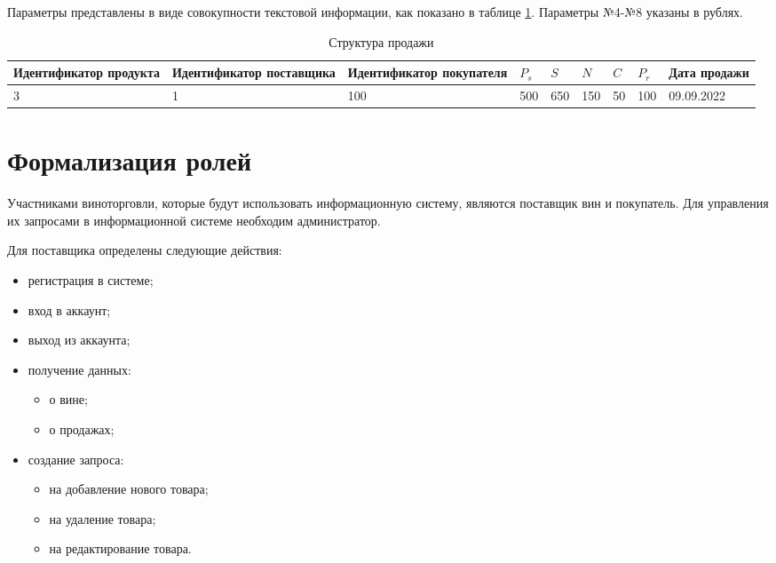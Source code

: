 Параметры представлены в виде совокупности текстовой информации, как показано в таблице \ref{sale_structure}. Параметры №4-№8 указаны в рублях.

\begin{table}[h]
    \begin{center}
        \begin{threeparttable}
        \captionsetup{justification=raggedright,singlelinecheck=off}
    		\caption{Структура продажи}
    		\label{sale_structure}
    		\footnotesize
        \begin{tabular}{|p{25mm}|p{25mm}|p{25mm}|l|l|l|l|l|p{15mm}|}
            \hline
            Идентификатор продукта & Идентификатор поставщика & Идентификатор покупателя & $P_{s}$ & $S$ & $N$ & $C$ & $P_{r}$ & Дата продажи\\ \hline
            3 & 1 & 100 & 500 & 650 & 150 & 50 & 100 & 09.09.2022 \\ \hline
        \end{tabular}
    \end{threeparttable}
    \end{center}
\end{table}

\section{Формализация ролей}

Участниками виноторговли, которые будут использовать информационную систему, являются поставщик вин и покупатель. Для управления их запросами в информационной системе необходим администратор.

Для поставщика определены следующие действия:

\begin{itemize}
	\item регистрация в системе;
	\item вход в аккаунт;
	\item выход из аккаунта;
	\item получение данных:
		\begin{itemize}
			\item о вине;
			\item о продажах;
		\end{itemize}		 
	\item создание запроса:
		\begin{itemize}
			\item на добавление нового товара;
			\item на удаление товара;
			\item на редактирование товара.
		\end{itemize}
\end{itemize}

